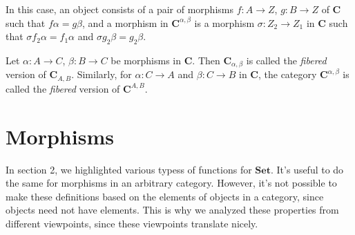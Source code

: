 In this case, an object consists of a pair of morphisms $f : A \to Z$, $g : B \to Z$ of $\mathbf{C}$ such that $f\alpha =g\beta $, and a morphism in $\mathbf{C}^{\alpha ,\beta }$ is a morphism $\sigma : Z_2 \to Z_1$ in $\mathbf{C}$ such that $\sigma f_2\alpha =f_1\alpha $ and $\sigma g_2\beta =g_2\beta $.
\begin{definition}[Fibered]\label{dfn:1.3.7}
	Let $\alpha : A \to C$, $\beta : B \to C$ be morphisms in $\mathbf{C}$. Then $\mathbf{C}_{\alpha ,\beta }$ is called the \emph{fibered} version of $\mathbf{C}_{A,B}$. Similarly, for $\alpha : C \to A$ and $\beta : C \to B$ in $\mathbf{C}$, the category $\mathbf{C}^{\alpha ,\beta }$ is called the \emph{fibered} version of $\mathbf{C}^{A,B}$.
\end{definition}
\section{Morphisms}
In section 2, we highlighted various typess of functions for $\mathbf{Set}$. It's useful to do the same for morphisms in an arbitrary category. However, it's not possible to make these definitions based on the elements of objects in a category, since objects need not have elements. This is why we analyzed these properties from different viewpoints, since these viewpoints translate nicely.
